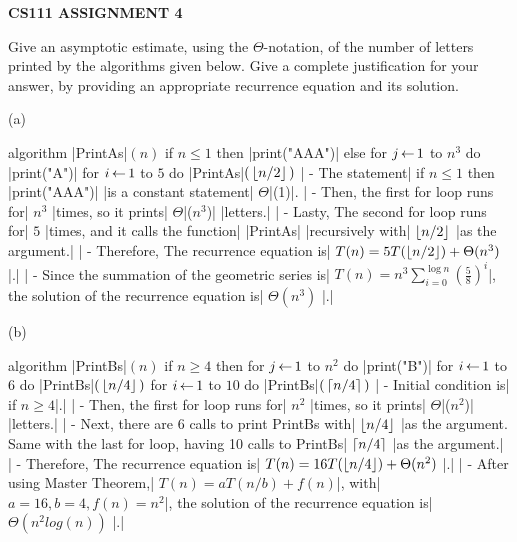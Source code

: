 \documentclass{article}
\begin{document}
\centerline{\large \bf CS111 ASSIGNMENT 4}


\vskip 0.15in



\newcommand{\calT}{{\mathcal{T}}}


\begin{problem}
Give an asymptotic estimate, using the $\Theta$-notation, of the number of letters printed by the
algorithms given below. Give a complete justification for your answer, by providing an appropriate recurrence
equation and its solution.

\medskip
\noindent
(a) 
\hspace{0.01in}
%
\begin{minipage}[t]{2.4in}
\strut\vspace*{- 2.5 \baselineskip}\newline 

\begin{program}
algorithm |PrintAs|$(n)$
   if $n\le 1$ then
      |print("AAA")|
   else
      for $j{\,\leftarrow\,} 1$ to $n^3$
         do |print("A")|
      for $i{\,\leftarrow\,} 1$ to $5$ do
         |PrintAs|$(\,{\left\lfloor n/2\right\rfloor}\,)$
| - The statement| if $n\le 1$ then |print("AAA")| |is a constant statement| $\Theta$|(1)|. 
| - Then, the first for loop runs for| $n^3$ |times, so it prints| $\Theta$|($n^3$)| |letters.|
| - Lasty, The second for loop runs for| $5$ |times, and it calls the function| |PrintAs| |recursively with| ${\left\lfloor n/2\right\rfloor}$ |as the argument.|
| - Therefore, The recurrence equation is| $T(n) = 5T({\left\lfloor n/2\right\rfloor}) + \Theta(n^3)$ |.|
| - Since the summation of the geometric series is| $T(n) = n^3\sum_{i=0}^{\log n} \left(\frac{5}{8}\right)^i$|, the solution of the recurrence equation is| $\Theta(n^3)$ |.|
\end{program}
\end{minipage}
%
\hspace{0.4in}
(b) 
\hspace{0.01in}
%
\begin{minipage}[t]{2.4in}
\strut\vspace*{- 2.5 \baselineskip}\newline 

\begin{program}
algorithm |PrintBs|$(n)$
   if $n\ge 4$ then
      for $j{\,\leftarrow\,} 1$ to $n^2$
         do |print("B")|
      for $i{\,\leftarrow\,} 1$ to $6$ do
         |PrintBs|$(\,{\left\lfloor n/4\right\rfloor}\,)$
      for $i{\,\leftarrow\,} 1$ to $10$ do
         |PrintBs|$(\,{\left\lceil n/4\right\rceil}\,)$
| - Initial condition is| if $n\ge4$|.|
| - Then, the first for loop runs for| $n^2$ |times, so it prints| $\Theta$|($n^2$)| |letters.|
| - Next, there are 6 calls to print PrintBs with| ${\left\lfloor n/4\right\rfloor}$ |as the argument. Same with the last for loop, having 10 calls to PrintBs| ${\left\lceil n/4\right\rceil}$ |as the argument.|
| - Therefore, The recurrence equation is| $T(n) = 16T({\left\lfloor n/4\right\rfloor}) + \Theta(n^2)$ |.|
| - After using Master Theorem,| $T(n)=aT(n/b)+f(n)$|, with| $a=16, b=4, f(n)=n^2$|, the solution of the recurrence equation is| $\Theta(n^2log(n))$ |.|
\end{program}
\end{minipage}


\end{problem}
\end{document}
